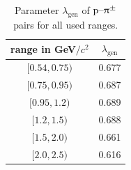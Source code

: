 \documentclass[ALICE,manyauthors]{cernphprep}
\begin{document}
\begin{table}[h]
    \centering
    \begin{tabular}{| c | c |}
    \hline
        \mtText{} range in GeV$/c^2$ & $\lambda_{\text{gen}}$ \\
        \hline
        \hline
        $[0.54, 0.75)$ & 0.677\\
        $[0.75, 0.95)$ & 0.687\\
        $[0.95, 1.2)$ & 0.689\\
        $[1.2, 1.5)$ & 0.688\\
        $[1.5, 2.0)$ & 0.661\\
        $[2.0, 2.5)$ & 0.616\\
        \hline
    \end{tabular}
    \caption{Parameter $\lambda_{\text{gen}}$ of $\text{p--}\uppi^\pm$ pairs for all used \mtText{} ranges.}
    \label{Tab. Lambda Gen Values}
\end{table}
\end{document}
